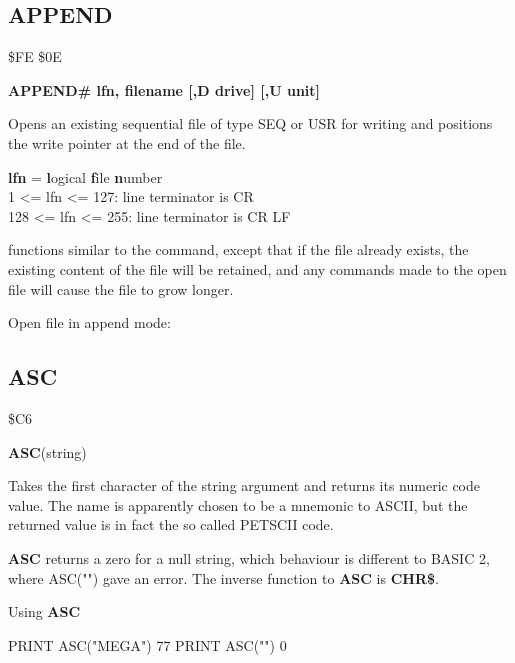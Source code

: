 \subsection{APPEND}
\begin{description}[leftmargin=3cm,style=nextline]
\item [Token:] \$FE \$0E
\item [Format:]
  {\bf APPEND\# lfn, filename [,D drive] [,U unit] }
\item [Usage:]
   Opens an existing sequential file of type
   SEQ or USR for writing and positions the write pointer
   at the end of the file.

   {\bf lfn} = {\bf l}ogical {\bf f}ile {\bf n}umber \\
   1 <= lfn <= 127: line terminator is CR \\
   128 <= lfn <= 255: line terminator is CR LF

   \filenamedefinition

   \drivedefinition

   \unitdefinition

\item [Remarks:]
    functions similar to the 
   command, except that if the file already
   exists, the existing content of the file will be retained, and any
    commands made to the
   open file will cause the file to grow longer.

\item [Example:] Open file in append mode:

\end{description}


\newpage
\subsection{ASC}
\begin{description}[leftmargin=3cm,style=nextline]
\item [Token:] \$C6
\item [Format:] {\bf ASC}(string)
\item [Usage:] Takes the first character of
               the string argument and returns its numeric code value.
               The name is apparently chosen to be a mnemonic to ASCII,
               but the returned value is in fact the so called PETSCII code.
\item [Remarks:]
               {\bf ASC} returns a zero for a null string, which behaviour
               is different to BASIC 2, where ASC("") gave an error.
               The inverse function to {\bf ASC} is {\bf CHR\$}.
\item [Example:] Using {\bf ASC}
\begin{screenoutput}
  PRINT ASC("MEGA")
  77
  PRINT ASC("")
  0
\end{screenoutput}
\end{description}

